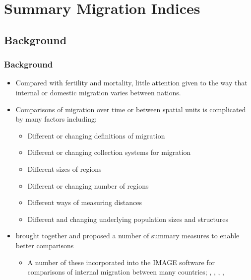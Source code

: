 \documentclass[
]{book}
\providecommand{\tightlist}{%
  \setlength{\itemsep}{0pt}\setlength{\parskip}{0pt}}
\begin{document}
\hypertarget{summary-migration-indices}{%
\chapter{Summary Migration Indices}\label{summary-migration-indices}}

\hypertarget{background}{%
\section{Background}\label{background}}

\hypertarget{background-1}{%
\subsection{Background}\label{background-1}}

\begin{itemize}
\tightlist
\item
  Compared with fertility and mortality, little attention given to the way that internal or domestic migration varies between nations.
\item
  Comparisons of migration over time or between spatial units is complicated by many factors including:

  \begin{itemize}
  \tightlist
  \item
    Different or changing definitions of migration
  \item
    Different or changing collection systems for migration
  \item
    Different sizes of regions
  \item
    Different or changing number of regions
  \item
    Different ways of measuring distances
  \item
    Different and changing underlying population sizes and structures
  \end{itemize}
\item
  \citet{Bell2002} brought together and proposed a number of summary measures to enable better comparisons

  \begin{itemize}
  \tightlist
  \item
    A number of these incorporated into the IMAGE software for comparisons of internal migration between many countries; \citet{Bell2015}, \citet{Bell2015a}, \citet{Stillwell2016}, \citet{Rees2016}, \citet{Bernard2014}
  \end{itemize}
\end{itemize}
\end{document}
